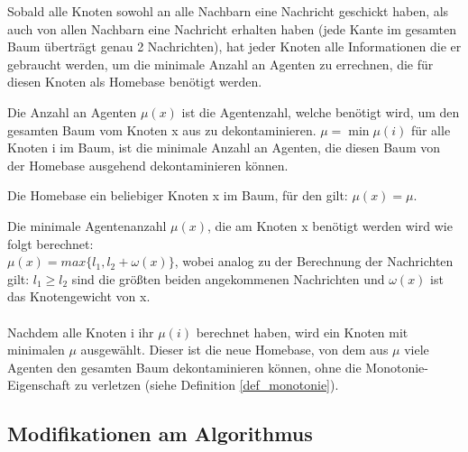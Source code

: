 
Sobald alle Knoten sowohl an alle Nachbarn eine Nachricht geschickt haben, als auch von allen Nachbarn eine Nachricht erhalten haben (jede Kante im gesamten Baum überträgt genau 2 Nachrichten), hat jeder Knoten alle Informationen die er gebraucht werden, um die minimale Anzahl an Agenten zu errechnen, die für diesen Knoten als Homebase benötigt werden.

\begin{mydef}
	Die Anzahl an Agenten $\mu(x)$ ist die Agentenzahl, welche benötigt wird, um den gesamten Baum vom Knoten x aus zu dekontaminieren. $\mu = \min \mu(i)$ für alle Knoten i im Baum, ist die minimale Anzahl an Agenten, die diesen Baum von der Homebase ausgehend dekontaminieren können.
\end{mydef}

\begin{mydef}\label{def_homebase}
	Die Homebase ein beliebiger Knoten x im Baum, für den gilt: $\mu(x) = \mu$.
\end{mydef}

Die minimale Agentenanzahl $\mu(x)$, die am Knoten x benötigt werden wird wie folgt berechnet:
\\
$\mu(x) = max\{l_{1},  l_{2} + \omega(x)\}$, wobei analog zu der Berechnung der Nachrichten gilt: $l_{1} \ge l_{2}$ sind die größten beiden angekommenen Nachrichten und $\omega(x)$ ist das Knotengewicht von x.
\\
\\
Nachdem alle Knoten i ihr $\mu(i)$ berechnet haben, wird ein Knoten mit minimalen $\mu$ ausgewählt. Dieser ist die neue Homebase, von dem aus $\mu$ viele Agenten den gesamten Baum dekontaminieren können, ohne die Monotonie-Eigenschaft zu verletzen (siehe Definition \ref{def_monotonie}).

\newpage

\subsection{Modifikationen am Algorithmus}\label{modifizierterAlgoChapter}


